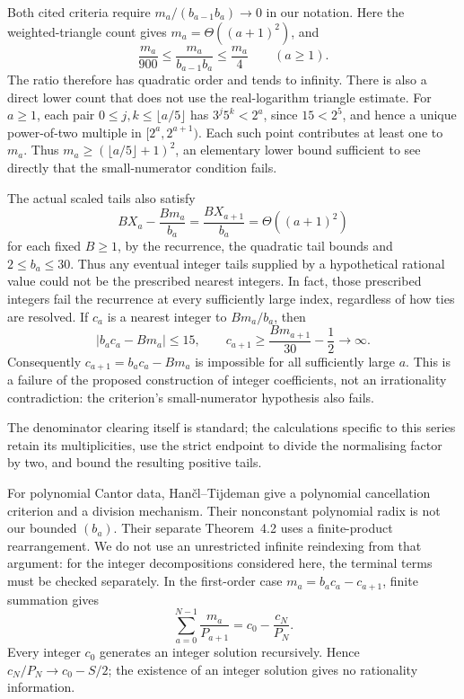 \documentclass[11pt]{article}
\theoremstyle{remark}
\theoremstyle{plain}
\begin{document}
Both cited criteria require $m_a/(b_{a-1}b_a)\to0$ in our notation.
Here the weighted-triangle count gives $m_a=\Theta((a+1)^2)$, and
\[
 \frac{m_a}{900}\le\frac{m_a}{b_{a-1}b_a}\le\frac{m_a}{4}
 \qquad(a\ge1).
\]
The ratio therefore has quadratic order and tends to infinity.
There is also a direct lower count that does not use the real-logarithm
triangle estimate.  For $a\ge1$, each pair
$0\le j,k\le\lfloor a/5\rfloor$ has $3^j5^k<2^a$, since $15<2^5$,
and hence a unique power-of-two multiple in $[2^a,2^{a+1})$.
Each such point contributes at least one to $m_a$.  Thus
$m_a\ge(\lfloor a/5\rfloor+1)^2$, an elementary lower bound sufficient
to see directly that the small-numerator condition fails.

The actual scaled tails also satisfy
\[
 BX_a-\frac{Bm_a}{b_a}=\frac{BX_{a+1}}{b_a}
 =\Theta((a+1)^2)
\]
for each fixed $B\ge1$, by the recurrence, the quadratic tail bounds and
$2\le b_a\le30$.  Thus any eventual integer tails supplied by a
hypothetical rational value could not be the prescribed nearest integers.
In fact, those prescribed integers fail the recurrence at every
sufficiently large index, regardless of how ties are resolved.  If $c_a$
is a nearest integer to $Bm_a/b_a$, then
\[
 |b_ac_a-Bm_a|\le15,\qquad
 c_{a+1}\ge\frac{Bm_{a+1}}{30}-\frac12\longrightarrow\infty.
\]
Consequently $c_{a+1}=b_ac_a-Bm_a$ is impossible for all sufficiently
large $a$.  This is a failure of the proposed construction of integer coefficients, not an irrationality
contradiction: the criterion's small-numerator hypothesis also fails.

The denominator clearing itself is standard; the calculations specific
to this series retain its multiplicities, use the strict endpoint to
divide the normalising factor by two, and bound the resulting positive tails.

For polynomial Cantor data, Han\v{c}l--Tijdeman
\cite[Theorems~2.2 and 3.1]{hancltijdeman2008} give a polynomial
cancellation criterion and a division mechanism.  Their nonconstant
polynomial radix is not our bounded $(b_a)$.  Their separate
Theorem~4.2 uses a finite-product rearrangement.  We do not use an
unrestricted infinite reindexing from that argument: for the integer
decompositions considered here, the terminal terms must be checked
separately.  In the first-order case
$m_a=b_ac_a-c_{a+1}$, finite summation gives
\[
 \sum_{a=0}^{N-1}\frac{m_a}{P_{a+1}}
 =c_0-\frac{c_N}{P_N}.
\]
Every integer $c_0$ generates an integer solution recursively.  Hence
$c_N/P_N\to c_0-S/2$; the existence of an integer solution gives no
rationality information.
\end{document}
